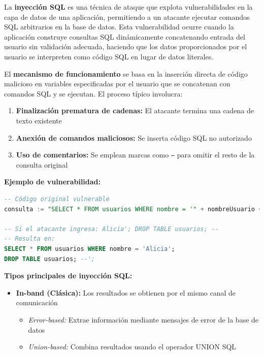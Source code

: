 {La \textbf{inyección SQL} es una técnica de ataque que explota vulnerabilidades en la capa de datos de una aplicación, permitiendo a un atacante ejecutar comandos SQL arbitrarios en la base de datos. Esta vulnerabilidad ocurre cuando la aplicación construye consultas SQL dinámicamente concatenando entrada del usuario sin validación adecuada, haciendo que los datos proporcionados por el usuario se interpreten como código SQL en lugar de datos literales.

El \textbf{mecanismo de funcionamiento} se basa en la inserción directa de código malicioso en variables especificadas por el usuario que se concatenan con comandos SQL y se ejecutan. El proceso típico involucra:

\begin{enumerate}
    \item \textbf{Finalización prematura de cadenas:} El atacante termina una cadena de texto existente
    \item \textbf{Anexión de comandos maliciosos:} Se inserta código SQL no autorizado
    \item \textbf{Uso de comentarios:} Se emplean marcas como \texttt{--} para omitir el resto de la consulta original
\end{enumerate}

\textbf{Ejemplo de vulnerabilidad:}

\begin{lstlisting}[language=SQL, caption=Consulta vulnerable por concatenación]
-- Código original vulnerable
consulta := "SELECT * FROM usuarios WHERE nombre = '" + nombreUsuario + "';"

-- Si el atacante ingresa: Alicia'; DROP TABLE usuarios; --
-- Resulta en:
SELECT * FROM usuarios WHERE nombre = 'Alicia'; 
DROP TABLE usuarios; --';
\end{lstlisting}

\textbf{Tipos principales de inyección SQL:}

\begin{itemize}
    \item \textbf{In-band (Clásica):} Los resultados se obtienen por el mismo canal de comunicación
    \begin{itemize}
        \item \textit{Error-based:} Extrae información mediante mensajes de error de la base de datos
        \item \textit{Union-based:} Combina resultados usando el operador UNION SQL
    \end{itemize}
    

\end{itemize}}
